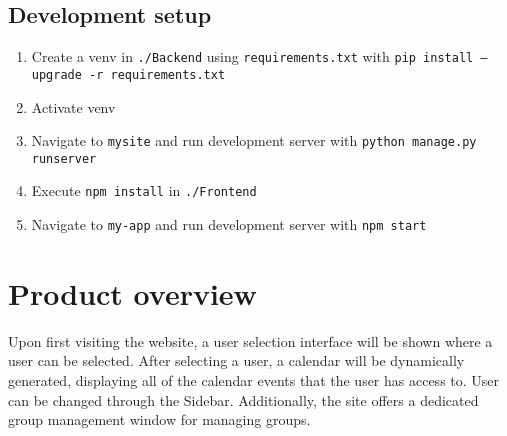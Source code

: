 \documentclass[]{article}
\begin{document}
	\subsection{Development setup}
		\begin{enumerate}
			\item Create a venv in \texttt{./Backend} using \texttt{requirements.txt} with \texttt{pip install --upgrade -r requirements.txt}
			\item Activate venv
			\item Navigate to \texttt{mysite} and run development server with \texttt{python manage.py runserver}
			\item Execute \texttt{npm install} in \texttt{./Frontend}
			\item Navigate to \texttt{my-app} and run development server with \texttt{npm start}
		\end{enumerate}
\section{Product overview}
	Upon first visiting the website, a user selection interface will be shown where a user can be selected. After selecting a user, a calendar will be dynamically generated, displaying all of the calendar events that the user has access to. User can be changed through the Sidebar. Additionally, the site offers a dedicated group management window for managing groups.
\end{document}

